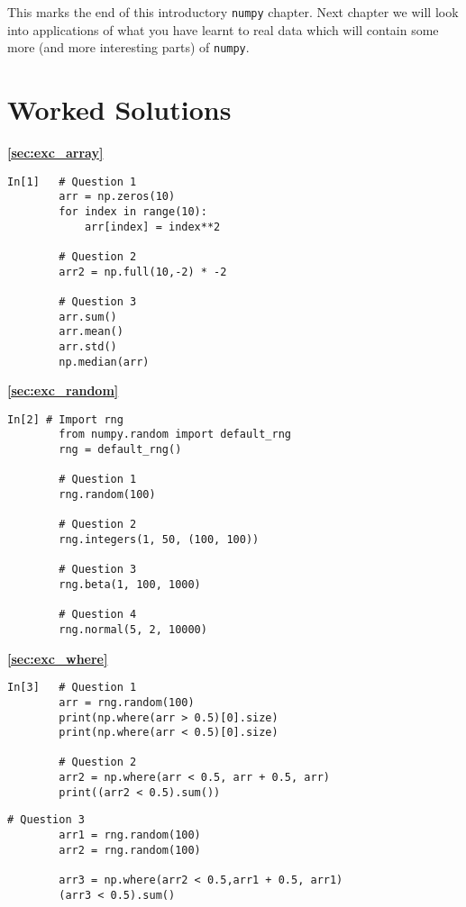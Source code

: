 This marks the end of this introductory \texttt{numpy} chapter. Next chapter we will look into applications of what you have learnt to real data which will contain some more (and more interesting parts) of \texttt{numpy}.

\section{Worked Solutions}
\textbf{\ref{sec:exc_array}}

\begin{lstlisting}[style=PY]
In[1]   # Question 1
        arr = np.zeros(10)
        for index in range(10):
            arr[index] = index**2
        
        # Question 2
        arr2 = np.full(10,-2) * -2
        
        # Question 3
        arr.sum()
        arr.mean()
        arr.std()
        np.median(arr)
\end{lstlisting}

\textbf{\ref{sec:exc_random}}
\begin{lstlisting}[style=PY]
  In[2] # Import rng
        from numpy.random import default_rng
        rng = default_rng()

        # Question 1
        rng.random(100)
        
        # Question 2
        rng.integers(1, 50, (100, 100))
        
        # Question 3
        rng.beta(1, 100, 1000)
        
        # Question 4
        rng.normal(5, 2, 10000)
\end{lstlisting}

\textbf{\ref{sec:exc_where}}
\begin{lstlisting}[style=PY]
In[3]   # Question 1
        arr = rng.random(100)
        print(np.where(arr > 0.5)[0].size)
        print(np.where(arr < 0.5)[0].size)
        
        # Question 2
        arr2 = np.where(arr < 0.5, arr + 0.5, arr)
        print((arr2 < 0.5).sum())
\end{lstlisting}
\newpage
\begin{lstlisting}[style=PY]
        # Question 3
        arr1 = rng.random(100)
        arr2 = rng.random(100)
        
        arr3 = np.where(arr2 < 0.5,arr1 + 0.5, arr1)
        (arr3 < 0.5).sum()
\end{lstlisting}
